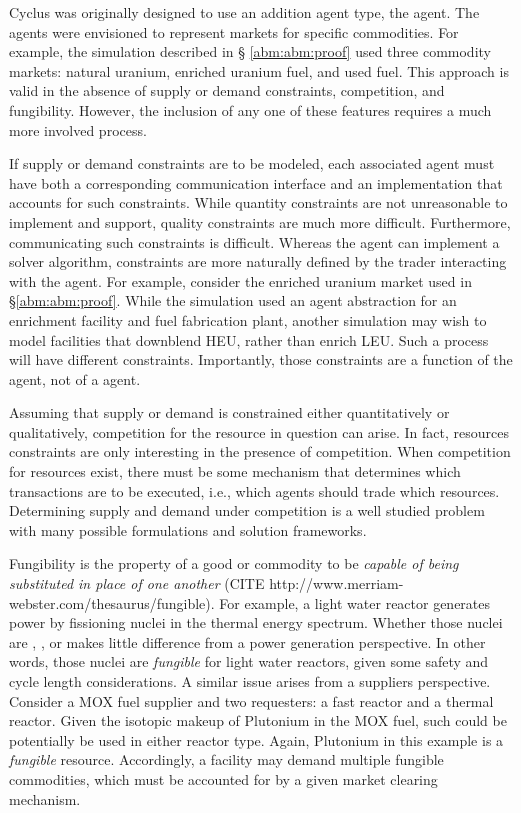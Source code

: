 Cyclus was originally designed to use an addition agent type, the 
agent. The  agents were envisioned to represent markets for
specific commodities. For example, the simulation described in \S
\ref{abm:abm:proof} used three commodity markets: natural uranium, enriched
uranium fuel, and used fuel. This approach is valid in the absence of supply or
demand constraints, competition, and fungibility. However, the inclusion of any
one of these features requires a much more involved process.

If supply or demand constraints are to be modeled, each
associated  agent must have both a corresponding communication
interface and an implementation that accounts for such constraints. While
quantity constraints are not unreasonable to implement and support, quality
constraints are much more difficult. Furthermore, communicating such constraints
is difficult. Whereas the  agent can implement a solver algorithm,
constraints are more naturally defined by the trader interacting with the
 agent. For example, consider the enriched uranium market used in
\S \ref{abm:abm:proof}. While the simulation used an agent abstraction for an
enrichment facility and fuel fabrication plant, another simulation may wish to
model facilities that downblend HEU, rather than enrich LEU. Such a process will
have different constraints. Importantly, those constraints are a function of the
 agent, not of a  agent.

Assuming that supply or demand is constrained either quantitatively or
qualitatively, competition for the resource in question can arise. In fact,
resources constraints are only interesting in the presence of competition. When
competition for resources exist, there must be some mechanism that determines
which transactions are to be executed, i.e., which agents should trade which
resources. Determining supply and demand under competition is a well studied
problem with many possible formulations and solution frameworks.

Fungibility is the property of a good or commodity to be \textit{capable of
  being substituted in place of one another} (CITE
http://www.merriam-webster.com/thesaurus/fungible). For example, a light water
reactor generates power by fissioning nuclei in the thermal energy
spectrum. Whether those nuclei are , , or
 makes little difference from a power generation perspective. In
other words, those nuclei are \textit{fungible} for light water reactors, given
some safety and cycle length considerations. A similar issue arises from a
suppliers perspective. Consider a MOX fuel supplier and two requesters: a fast
reactor and a thermal reactor. Given the isotopic makeup of Plutonium in the MOX
fuel, such could be potentially be used in either reactor type. Again, Plutonium
in this example is a \textit{fungible} resource. Accordingly, a facility may
demand multiple fungible commodities, which must be accounted for by a given
market clearing mechanism.

